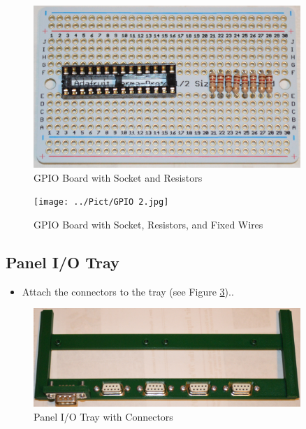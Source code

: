 \documentclass[10pt, openany]{book}
\begin{document}
\begin{figure}[ht!]
  \centering
  \includegraphics[width=0.9\textwidth]{../Pict/GPIO 1.jpg}
  \caption{GPIO Board with Socket and Resistors}
  \label{fig:GPIO1}
\end{figure}

\begin{figure}[ht!]
  \centering
  \texttt{[image: ../Pict/GPIO 2.jpg]}
  \caption{GPIO Board with Socket, Resistors, and Fixed Wires}
  \label{fig:GPIO2}
\end{figure}

\subsection{Panel I/O Tray}
\begin{itemize}
  \item Attach the connectors to the tray (see Figure \ref{fig:PanelIO1})..
\end{itemize}

\begin{figure}[ht!]
  \centering
  \includegraphics[width=0.9\textwidth]{../Pict/Panel IO Tray1.jpg}
  \caption{Panel I/O Tray with Connectors}
  \label{fig:PanelIO1}
\end{figure}
\end{document}
